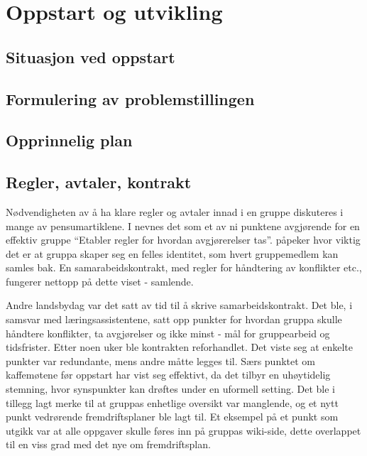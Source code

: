 
\chapter{Oppstart og utvikling}

\section{Situasjon ved oppstart}

\section{Formulering av problemstillingen}

\section{Opprinnelig plan}

\section{Regler, avtaler, kontrakt}
Nødvendigheten av å ha klare regler og avtaler innad i en gruppe diskuteres i
mange av pensumartiklene. I \cite{schwartz} nevnes det som et av ni punktene
avgjørende for en effektiv gruppe ``Etabler regler for hvordan avgjørerelser
tas''. \cite{jj} påpeker hvor viktig det er at gruppa skaper seg en felles
identitet, som hvert gruppemedlem kan samles bak. En samarabeidskontrakt, med
regler for håndtering av konflikter etc., fungerer nettopp på dette viset -
samlende. 

Andre landsbydag var det satt av tid til å skrive samarbeidskontrakt. Det ble, i
samsvar med læringsassistentene, satt opp punkter for hvordan gruppa skulle
håndtere konflikter, ta avgjørelser og ikke minst - mål for gruppearbeid og
tidsfrister. Etter noen uker ble kontrakten reforhandlet. Det viste seg at
enkelte punkter var redundante, mens andre måtte legges til. Særs punktet om
kaffemøtene før oppstart har vist seg effektivt, da det tilbyr en uhøytidelig
stemning, hvor synspunkter kan drøftes under en uformell setting. Det ble i
tillegg lagt merke til at gruppas enhetlige oversikt var manglende, og et nytt
punkt vedrørende fremdriftsplaner ble lagt til. Et eksempel på et punkt som
utgikk var at alle oppgaver skulle føres inn på gruppas wiki-side, dette
overlappet til en viss grad med det nye om fremdriftsplan.

